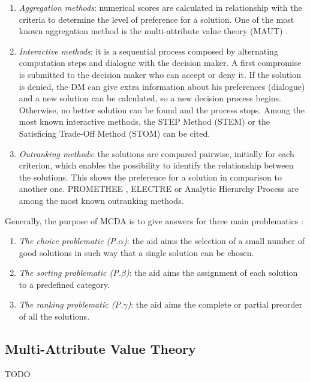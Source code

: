 \begin{enumerate}
\item \textit{Aggregation methods}: numerical scores are calculated in relationship with the criteria to determine the level of preference for a solution. One of the most known aggregation method is the multi-attribute value theory (MAUT) \cite{MMAUT}.
\item \textit{Interactive methods}: it is a sequential process composed by alternating computation steps and dialogue with the decision maker. A first compromise is submitted to the decision maker who can accept or deny it. If the solution is denied, the DM can give extra information about his preferences (dialogue) and a new solution can be calculated, so a new decision process begins. Otherwise, no better solution can be found and the process stops. Among the most known interactive methods, the STEP Method (STEM) \cite{benayoun71} or the Satisficing Trade-Off Method (STOM) \cite{nakayama84} can be cited.
\item \textit{Outranking methods}: the solutions are compared pairwise, initially for each criterion, which enables the possibility to identify the relationship between the solutions. This shows the preference for a solution in comparison to another one. PROMETHEE \cite{Brans1}, ELECTRE \cite{Roy66} or Analytic Hierarchy Process \cite{MAHP} are among the most known outranking methods.
\end{enumerate}


Generally, the purpose of MCDA is to give answers for three main problematics \cite{EhrgottFigueiraGreco2005}:
\begin{enumerate}
\item \textit{The choice problematic (P.$\alpha$)}: the aid aims the selection of a small number of good solutions in such way that a single solution can be chosen.
\item \textit{The sorting problematic (P.$\beta$)}: the aid aims the assignment of each solution to a predefined category.
\item \textit{The ranking problematic (P.$\gamma$)}: the aid aims the complete or partial preorder of all the solutions.
\end{enumerate}

\subsection{Multi-Attribute Value Theory}
TODO

